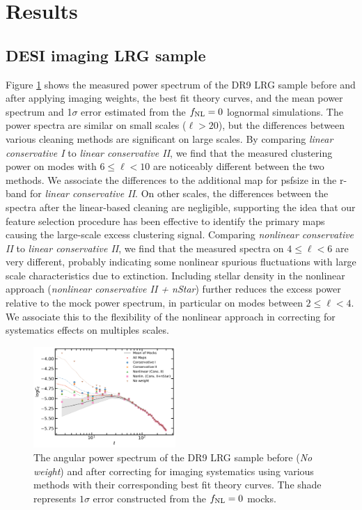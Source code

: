 \section{Results}\label{sec:results}
\subsection{DESI imaging LRG sample}

Figure \ref{fig:cl_dr9} shows the measured power spectrum of the DR9 LRG sample before and after applying imaging weights, the best fit theory curves, and the mean power spectrum and 1$\sigma$ error estimated from the $f_{\rm NL}=0$ lognormal simulations. The power spectra are similar on small scales ($\ell > 20$), but the differences between various cleaning methods are significant on large scales. By comparing \textit{linear conservative I} to \textit{linear conservative II}, we find that the measured clustering power on modes with $6\leq \ell < 10$ are noticeably different between the two methods. We associate the differences to the additional map for psfsize in the r-band for \textit{linear conservative II}. On other scales, the differences between the spectra after the linear-based cleaning are negligible, supporting the idea that our feature selection procedure has been effective to identify the primary maps causing the large-scale excess clustering signal. Comparing \textit{nonlinear conservative II} to \textit{linear conservative II}, we find that the measured spectra on $4 \leq \ell < 6$ are very different, probably indicating some nonlinear spurious fluctuations with large scale characteristics due to extinction. Including stellar density in the nonlinear approach (\textit{nonlinear conservative II + nStar}) further reduces the excess power relative to the mock power spectrum, in particular on modes between $2\leq \ell < 4$. We associate this to the flexibility of the nonlinear approach in correcting for systematics effects on multiples scales.

\begin{figure}
    \centering
    \includegraphics[width=0.48\textwidth]{figures/model_dr9.pdf} 
    \caption{The angular power spectrum of the DR9 LRG sample before (\textit{No weight}) and after correcting for imaging systematics using various methods with their corresponding best fit theory curves. The shade represents $1\sigma$ error constructed from the $f_{\rm NL}=0$ mocks.}
    \label{fig:cl_dr9}
\end{figure}

